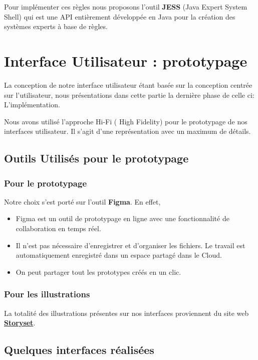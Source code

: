 Pour implémenter ces règles nous proposons l'outil \textbf{JESS} (Java Expert System Shell) qui est une API entièrement développée en Java pour la création des systèmes experts à base de règles.

\section{Interface Utilisateur : prototypage}

La conception de notre interface utilisateur étant basée sur la conception centrée sur l'utilisateur, nous présentations dans cette partie la dernière phase de celle ci: L'implémentation.

Nous avons utilisé l'approche Hi-Fi ( High Fidelity) pour le prototypage de nos interfaces utilisateur. Il s'agit d'une représentation avec un maximum de détails.
\subsection{Outils Utilisés pour le prototypage}
\subsubsection{Pour le prototypage}
Notre choix s'est porté sur l'outil \textbf{Figma}. En effet,
\begin{itemize}
    \item Figma est un outil de prototypage en ligne avec une fonctionnalité de collaboration en temps réel.
    \item Il n'est pas nécessaire d'enregistrer et d'organiser les fichiers. Le travail est automatiquement enregistré dans un espace partagé dans le Cloud.
    \item On peut partager tout les prototypes créés en un clic.
\end{itemize}

\subsubsection{Pour les illustrations}
La totalité des illustrations présentes sur nos interfaces proviennent du site web \textbf{\href{https://storyset.com/}{Storyset}}.

\subsection{Quelques interfaces réalisées}
